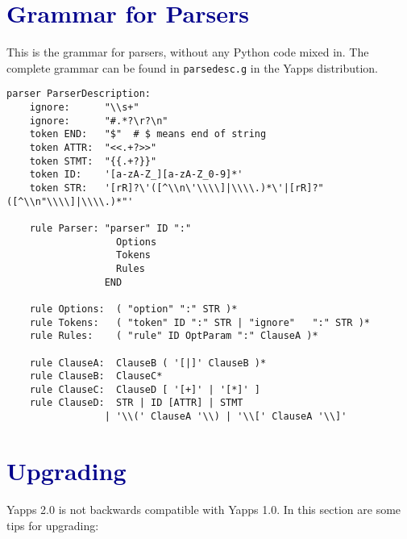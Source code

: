 \documentclass[10pt]{article}
\newcommand{\mysection}[1]{\section{\textcolor{darkblue}{#1}}}
\begin{document}
\appendix

\mysection{Grammar for Parsers}

This is the grammar for parsers, without any Python code mixed in.
The complete grammar can be found in \texttt{parsedesc.g} in the Yapps
distribution.

\begin{verbatim}
parser ParserDescription:
    ignore:      "\\s+"
    ignore:      "#.*?\r?\n"
    token END:   "$"  # $ means end of string
    token ATTR:  "<<.+?>>"
    token STMT:  "{{.+?}}"
    token ID:    '[a-zA-Z_][a-zA-Z_0-9]*'
    token STR:   '[rR]?\'([^\\n\'\\\\]|\\\\.)*\'|[rR]?"([^\\n"\\\\]|\\\\.)*"'

    rule Parser: "parser" ID ":"
                   Options
                   Tokens
                   Rules
                 END 

    rule Options:  ( "option" ":" STR )*
    rule Tokens:   ( "token" ID ":" STR | "ignore"   ":" STR )*
    rule Rules:    ( "rule" ID OptParam ":" ClauseA )*

    rule ClauseA:  ClauseB ( '[|]' ClauseB )*
    rule ClauseB:  ClauseC*
    rule ClauseC:  ClauseD [ '[+]' | '[*]' ]
    rule ClauseD:  STR | ID [ATTR] | STMT
                 | '\\(' ClauseA '\\) | '\\[' ClauseA '\\]'
\end{verbatim}

\mysection{Upgrading}

Yapps 2.0 is not backwards compatible with Yapps 1.0.  In this section 
are some tips for upgrading:
\end{document}
